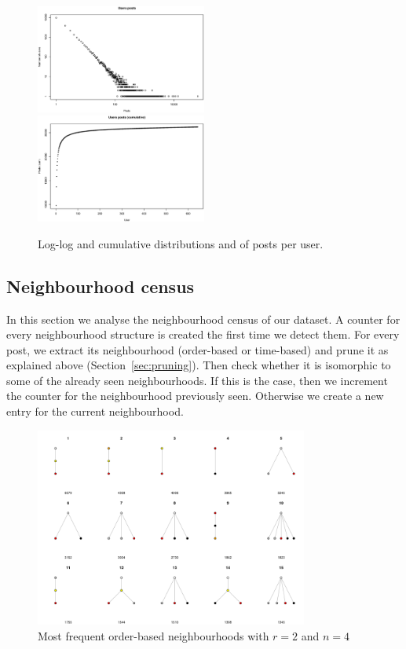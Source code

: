 \documentclass[conference]{IEEEtran}
\begin{document}
\begin{figure}
\centering
\includegraphics[width=0.5\textwidth]{users_posts}%
\includegraphics[width=0.5\textwidth]{users_posts_cum}
\caption{Log-log and cumulative distributions and of posts per user.}
\label{fig:podemos_distributions}
\end{figure}

\subsection{Neighbourhood census}
In this section we analyse the neighbourhood census of our dataset. A counter for every neighbourhood structure is created the first time we detect them. For every post, we extract its neighbourhood (order-based or time-based) and prune it as explained above (Section~\ref{sec:pruning}). Then check whether it is isomorphic to some of the already seen neighbourhoods. If this is the case, then we increment the counter for the neighbourhood previously seen. Otherwise we create a new entry for the current neighbourhood.

\begin{figure}
	\centering
	\includegraphics[width=0.8\textwidth]{census_orderbased_1}
	\caption{Most frequent order-based neighbourhoods with $r=2$ and $n=4$}
	\label{fig:census_orderbased}
\end{figure}
\end{document}
